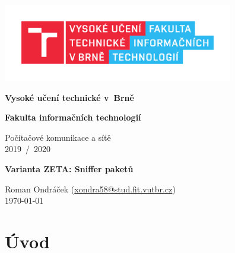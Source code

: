 \documentclass[12pt]{article}
\begin{document}
    \begin{titlepage}
        \begin{center}
            \includegraphics[height = 96pt]{img/FIT_barevne_CMYK_CZ.pdf} \\

            \begin{LARGE}
                \textbf{Vysoké učení technické v~Brně} \\
            \end{LARGE}

            \begin{Large}
                \textbf{Fakulta informačních technologií} \\
            \end{Large}

            \begin{large}
                Počítačové komunikace a sítě \\
                2019~/~2020
            \end{large}


            \begin{huge}
                \textbf{Varianta ZETA: Sniffer paketů} \\
            \end{huge}


            \begin{large}
                Roman Ondráček (\href{mailto:xondra58@stud.fit.vutbr.cz}{xondra58@stud.fit.vutbr.cz}) \\
                \today
            \end{large}
        \end{center}
    \end{titlepage}


    \tableofcontents
    \newpage

    \section*{Úvod}
\end{document}
